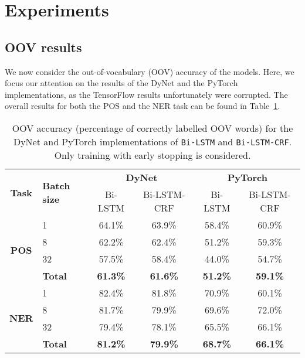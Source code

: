 
\section{Experiments}




\subsection{OOV results}

We now consider the out-of-vocabulary (OOV) accuracy of the models. Here, we
focus our attention on the results of the DyNet and the PyTorch implementations,
as the TensorFlow results unfortunately were corrupted. The overall results for
both the POS and the NER task can be found in
Table~\ref{table:oov-accuracy-total}.

\begin{table}[h!]
    \centering
    \begin{tabular}{c l c c|c c}
     \toprule
       \multirow{2}{*}{\bfseries Task}
     & \multirow{2}{*}{\bfseries Batch size}
     & \multicolumn{2}{c}{\bfseries DyNet}
     & \multicolumn{2}{c}{\bfseries PyTorch} \\

      \cmidrule(lr){3-6}
     && Bi-LSTM  & Bi-LSTM-CRF & Bi-LSTM  & Bi-LSTM-CRF \\ 

      \cmidrule(lr){1-6}
      \multirow{4}{*}{\textbf{POS}}
      &  1 & 64.1\% & 63.9\%  & 58.4\% & 60.9\%  \\
      &  8 & 62.2\% & 62.4\%  & 51.2\% & 59.3\%  \\
      & 32 & 57.5\% & 58.4\%  & 44.0\% & 54.7\%  \\ \cmidrule(lr){2-6}
      & \textbf{Total} &
      \textbf{61.3\%} & \textbf{61.6\%}  & \textbf{51.2\%} & \textbf{59.1\%} \\

      \cmidrule(lr){1-6}
      \multirow{4}{*}{\textbf{NER}}
     &  1 & 82.4\% & 81.8\%  & 70.9\% & 60.1\%  \\
     &  8 & 81.7\% & 79.9\%  & 69.6\% & 72.0\%  \\
     & 32 & 79.4\% & 78.1\%  & 65.5\% & 66.1\%  \\ \cmidrule(lr){2-6}
     & \textbf{Total} &
      \textbf{81.2\%} & \textbf{79.9\%}  & \textbf{68.7\%} & \textbf{66.1\%} \\

     \bottomrule
    \end{tabular}
    \caption{OOV accuracy (percentage of correctly labelled OOV words) for the DyNet
        and PyTorch implementations of \texttt{Bi-LSTM} and
        \texttt{Bi-LSTM-CRF}. Only training with early stopping is considered. 
    }\label{table:oov-accuracy-total}
\end{table}

